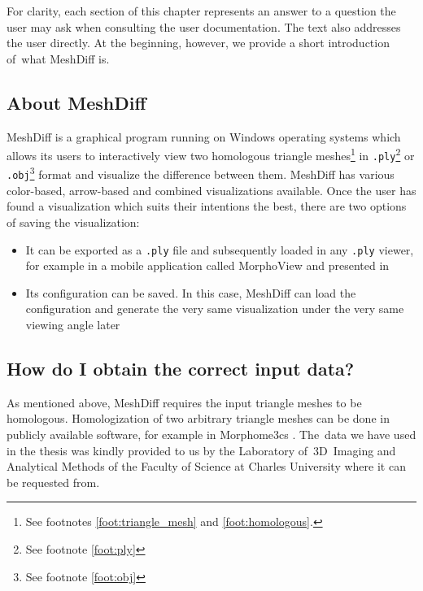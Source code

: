 For clarity, each section of this chapter represents an answer to a question the user may ask when consulting the user documentation. The text also addresses the user directly. At the beginning, however, we provide a short introduction of~what MeshDiff is.

\subsection{About MeshDiff}
\label{attch:user_doc-about}

MeshDiff is a graphical program running on Windows operating systems which allows its users to interactively view two homologous triangle meshes\footnote{See footnotes \ref{foot:triangle_mesh} and \ref{foot:homologous}.} in \verb+.ply+\footnote{See footnote \ref{foot:ply}} or \verb+.obj+\footnote{See footnote \ref{foot:obj}} format and visualize the difference between them. MeshDiff has various color-based, arrow-based and combined visualizations available. Once the user has found a visualization which suits their intentions the best, there are two options of saving the visualization:

\begin{itemize}
\item It can be exported as a \verb+.ply+ file and subsequently loaded in any \verb+.ply+ viewer, for example in a mobile application called MorphoView and  presented in \citet{Pikora}
\item Its configuration can be saved. In this case, MeshDiff can load the configuration and generate the very same visualization under the very same viewing angle later
\end{itemize}

\subsection{How do I obtain the correct input data?}
\label{attch:user_doc-input_data}

As mentioned above, MeshDiff requires the input triangle meshes to be homologous. Homologization of two arbitrary triangle meshes can be done in publicly available software, for example in Morphome3cs \citep{Morpho}. The~data we have used in the thesis was kindly provided to us by the Laboratory of~3D~Imaging and Analytical Methods of the Faculty of Science at Charles University where it can be requested from.


